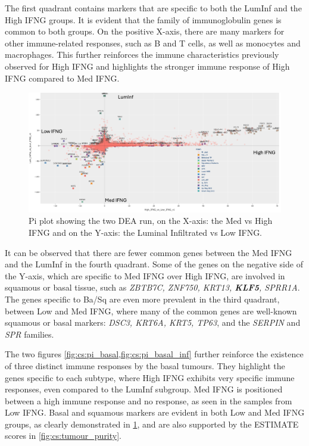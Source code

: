 The first quadrant contains markers that are specific to both the LumInf and the High IFNG groups. It is evident that the family of immunoglobulin genes is common to both groups. On the positive X-axis, there are many markers for other immune-related responses, such as B and T cells, as well as monocytes and macrophages. This further reinforces the immune characteristics previously observed for High IFNG and highlights the stronger immune response of High IFNG compared to Med IFNG.


\begin{figure}[!htb]    
    \centering
    \includegraphics[width=1.0\textwidth,keepaspectratio]{Sections/ClusteringAnalysis/Resources/discussion/basal_inf_pi.png}
    \caption{Pi plot showing the two DEA run, on the X-axis: the Med vs High IFNG and on the Y-axis: the Luminal Infiltrated vs Low IFNG. }
    \label{fig:cs:pi_basal_inf}
\end{figure}


It can be observed that there are fewer common genes between the Med IFNG and the LumInf in the fourth quadrant. Some of the genes on the negative side of the Y-axis, which are specific to Med IFNG over High IFNG, are involved in squamous or basal tissue, such as \textit{ZBTB7C, ZNF750, KRT13, \textbf{KLF5}, SPRR1A}. The genes specific to Ba/Sq are even more prevalent in the third quadrant, between Low and Med IFNG, where many of the common genes are well-known squamous or basal markers: \textit{DSC3, KRT6A, KRT5, TP63}, and the \textit{SERPIN} and \textit{SPR} families.

The two figures \cref{fig:cs:pi_basal,fig:cs:pi_basal_inf} further reinforce the existence of three distinct immune responses by the basal tumours. They highlight the genes specific to each subtype, where High IFNG exhibits very specific immune responses, even compared to the LumInf subgroup. Med IFNG is positioned between a high immune response and no response, as seen in the samples from Low IFNG. Basal and squamous markers are evident in both Low and Med IFNG groups, as clearly demonstrated in \cref{fig:cs:pi_basal_inf}, and are also supported by the ESTIMATE scores in \cref{fig:cs:tumour_purity}.




